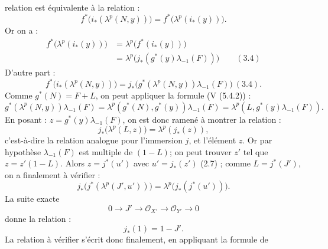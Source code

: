 relation est équivalente à la relation :
\[
  f^*\bigl(i_*(\lambda^p(N,y))\bigr)=
  f^*\bigl(\lambda^p(i_*(y))\bigr).
\]
Or on a :
\[
\begin{aligned}
 f^*\bigl(\lambda^p(i_*(y))\bigr)
 &=\lambda^p\bigl(f^*(i_*(y))\bigr)\\
 &=\lambda^p\bigl(j_*(g^*(y)\lambda_{-1}(F))\bigr)
\qquad(3.4)
\end{aligned}
\]
D'autre part :
\[
  f^*\bigl(i_*(\lambda^p(N,y))\bigr)
  =
  j_*\bigl(g^*(\lambda^p(N,y))\lambda_{-1}(F)\bigr)\ (3.4).
\]
Comme \(g^*(N)=F+L\), on peut appliquer la formule (V (5.4.2)) :
\[
  g^*(\lambda^p(N,y))\lambda_{-1}(F)
  =
  \lambda^p(g^*(N),g^*(y))\lambda_{-1}(F)
  =
  \lambda^p(L,g^*(y)\lambda_{-1}(F)).
\]
En posant : \(z=g^*(y)\lambda_{-1}(F)\), on est donc ramené à montrer la relation :
\[
  j_*\bigl(\lambda^p(L,z)\bigr)=\lambda^p(j_*(z)),
\]
c'est-à-dire la relation analogue pour l'immersion \(j\), et l'élément \(z\). Or par hypothèse \(\lambda_{-1}(F)\) est multiple de \((1-L)\); on peut trouver \(z'\) tel que \(z=z'(1-L)\). Alors \(z=j^*(u')\) avec \(u'=j_*(z')\) (2.7) ; comme \(L=j^*(J')\), on a finalement à vérifier :
\[
  j_*\bigl(j^*(\lambda^p(J',u'))\bigr)=
  \lambda^p\bigl(j_*(j^*(u'))\bigr).
\]
La suite exacte
\[
  0\longrightarrow J'\longrightarrow \mathcal O_{X'}
  \longrightarrow \mathcal O_{Y'}\longrightarrow 0
\]
donne la relation :
\begin{equation}\tag{4.3.2}
  j_*(1)=1-J'.
\end{equation}
La relation à vérifier s'écrit donc finalement, en appliquant la formule de
